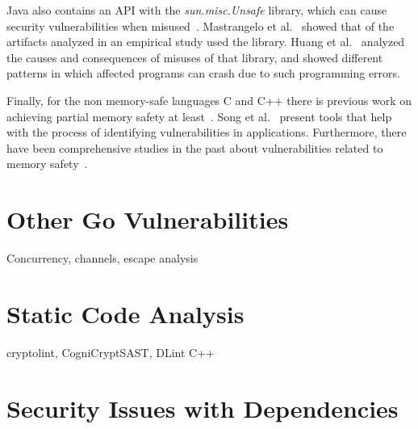 Java also contains an \unsafe{} API with the \textit{sun.misc.Unsafe} library, which can cause security vulnerabilities
when misused~\cite{mastrangelo2019}.
Mastrangelo et al.~\cite{mastrangelo2015} showed that  of the artifacts analyzed in an empirical study
used the \unsafe{} library.
Huang et al.~\cite{huang2019} analyzed the causes and consequences of misuses of that library, and showed different
patterns in which affected programs can crash due to such programming errors.

Finally, for the non memory-safe languages C and C++ there is previous work on achieving partial memory safety at
least~\cite{burow2018, nagarakatte2009}.
Song et al.~\cite{song2019} present tools that help with the process of identifying vulnerabilities in applications.
Furthermore, there have been comprehensive studies in the past about vulnerabilities related to memory
safety~\cite{szekeres2013,alnaeli2017,larochelle2001}.



\section{Other Go Vulnerabilities}\label{sec:related-work:other-go-vulnerabilities}

Concurrency, channels, escape analysis \cite{wang2020, sibiryov2017, tu2019, giunti2020, lange2017, zhou2017, dilley2019, hill2002, hannan1998, choi1999}



\section{Static Code Analysis}\label{sec:related-work:static-code-analysis}

cryptolint, CogniCryptSAST, DLint \cite{egele2013, kruger2018, gong2015, smith2020, gabet2020, wickert2019}
C++\cite{song2019}



\section{Security Issues with Dependencies}\label{sec:related-work:dependency-issues}

